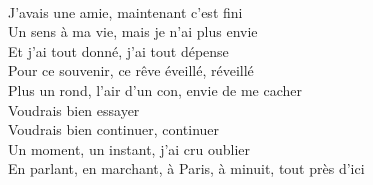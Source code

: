 \\
J'avais une amie, maintenant c'est fini \\
Un sens à ma vie, mais je n'ai plus envie \\
Et j'ai tout donné, j'ai tout dépense \\
Pour ce souvenir, ce rêve éveillé, réveillé \\
Plus un rond, l'air d'un con, envie de me cacher \\
Voudrais bien essayer \\
Voudrais bien continuer, continuer \\
Un moment, un instant, j'ai cru oublier \\
En parlant, en marchant, à Paris, à minuit, tout près d'ici \\
